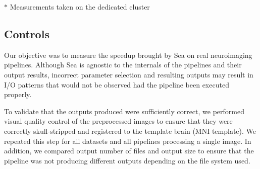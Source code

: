 \documentclass[fleqn,10pt]{wlscirep}
\begin{document}
    
    \begin{table}[t]
      \small\centering
    \footnotesize{$*$ Measurements taken on the dedicated cluster}
    \caption{Pipeline execution characteristics based on the processing of a single fMRI image using a single application process}
    \label{table:seaneuro-pipelines}
  \end{table}


    \subsection{Controls}
    Our objective was to measure the speedup brought by Sea on real neuroimaging
    pipelines. Although Sea is agnostic to the internals of the pipelines and
    their output results, incorrect parameter selection and resulting outputs
    may result in I/O patterns that would not be observed had the pipeline been
    executed properly.
   
    To validate that the outputs produced were sufficiently correct, we
    performed visual quality control of the preprocessed images to ensure that
    they were correctly skull-stripped and registered to the template brain (MNI
    template). We repeated this step for all datasets and all pipelines
    processing a single image. In addition, we compared output number of files
    and output size to ensure that the pipeline was not producing different
    outputs depending on the file system used.
    
\end{document}
